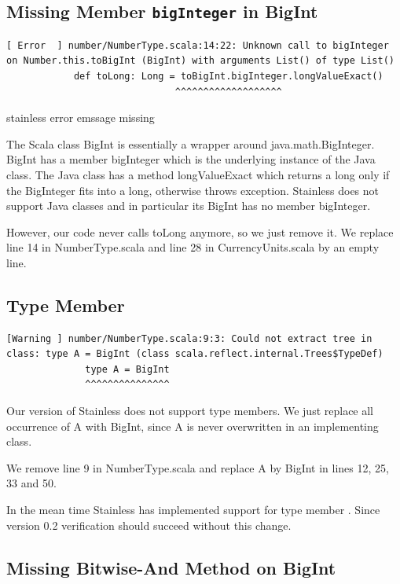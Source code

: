 \documentclass[runningheads]{llncs}
\newcommand{\todo}[1]{{\par \color{red}#1}}
\begin{document}
\subsection{Missing Member \texttt{bigInteger} in BigInt}


\begin{lstlisting}[style=stainless]
[ Error  ] number/NumberType.scala:14:22: Unknown call to bigInteger on Number.this.toBigInt (BigInt) with arguments List() of type List()
            def toLong: Long = toBigInt.bigInteger.longValueExact()
                              ^^^^^^^^^^^^^^^^^^^
\end{lstlisting}
\todo{stainless error emssage missing}

The Scala class BigInt is essentially a wrapper around
java.math.BigInteger. BigInt has a member bigInteger which is the
underlying instance of the Java class. The Java class has a method
longValueExact which returns a long only if the BigInteger fits into a
long, otherwise throws exception. Stainless does not support Java
classes and in particular its BigInt has no member bigInteger.

However, our code never calls toLong anymore, so we just remove it. We
replace line 14 in NumberType.scala and line 28 in CurrencyUnits.scala
by an empty line.


\subsection{Type Member}

\begin{lstlisting}[style=stainless]
[Warning ] number/NumberType.scala:9:3: Could not extract tree in class: type A = BigInt (class scala.reflect.internal.Trees$TypeDef)
              type A = BigInt
              ^^^^^^^^^^^^^^^
\end{lstlisting}

Our version of Stainless does not support type members. We just
replace all occurrence of A with BigInt, since A is never overwritten
in an implementing class.

We remove line 9 in NumberType.scala and replace A by BigInt in lines
12, 25, 33 and 50.

In the mean time Stainless has implemented support for type member
\cite{Stainless:pull470}.  Since version 0.2 verification should
succeed without this change.



\subsection{Missing Bitwise-And Method on BigInt}
\end{document}
